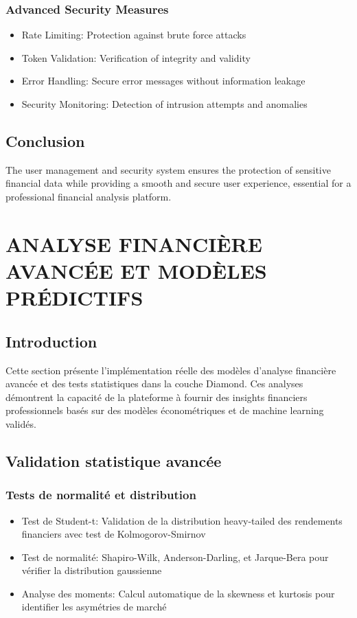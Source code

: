\documentclass[12pt,a4paper]{article}
\begin{document}
\subsubsection{Advanced Security Measures}
\begin{itemize}
    \item Rate Limiting: Protection against brute force attacks
    \item Token Validation: Verification of integrity and validity
    \item Error Handling: Secure error messages without information leakage
    \item Security Monitoring: Detection of intrusion attempts and anomalies
\end{itemize}

\subsection{Conclusion}
The user management and security system ensures the protection of sensitive financial data while providing a smooth and secure user experience, essential for a professional financial analysis platform.

\section{ANALYSE FINANCIÈRE AVANCÉE ET MODÈLES PRÉDICTIFS}

\subsection{Introduction}
Cette section présente l'implémentation réelle des modèles d'analyse financière avancée et des tests statistiques dans la couche Diamond. Ces analyses démontrent la capacité de la plateforme à fournir des insights financiers professionnels basés sur des modèles économétriques et de machine learning validés.

\subsection{Validation statistique avancée}
\subsubsection{Tests de normalité et distribution}
\begin{itemize}
    \item Test de Student-t: Validation de la distribution heavy-tailed des rendements financiers avec test de Kolmogorov-Smirnov
    \item Test de normalité: Shapiro-Wilk, Anderson-Darling, et Jarque-Bera pour vérifier la distribution gaussienne
    \item Analyse des moments: Calcul automatique de la skewness et kurtosis pour identifier les asymétries de marché
\end{itemize}
\end{document}
